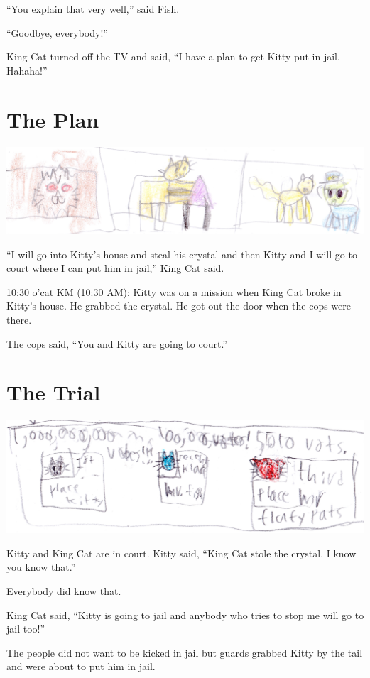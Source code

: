 \documentclass[12pt,oneside]{krantz}
\begin{document}
``You explain that very well,'' said Fish.

``Goodbye, everybody!''

King Cat turned off the TV and said, ``I have a plan to get Kitty put in
jail. Hahaha!''

\hypertarget{the-plan}{%
\chapter{The Plan}\label{the-plan}}

\includegraphics{img/cattriangle.jpg}

``I will go into Kitty's house and steal his crystal and then Kitty and
I will go to court where I can put him in jail,'' King Cat said.

10:30 o'cat KM (10:30 AM): Kitty was on a mission when King Cat broke in
Kitty's house. He grabbed the crystal. He got out the door when the cops
were there.

The cops said, ``You and Kitty are going to court.''

\hypertarget{the-trial}{%
\chapter{The Trial}\label{the-trial}}

\includegraphics{img/thirdplace.jpg}

Kitty and King Cat are in court. Kitty said, ``King Cat stole the
crystal. I know you know that.''

Everybody did know that.

King Cat said, ``Kitty is going to jail and anybody who tries to stop me
will go to jail too!''

The people did not want to be kicked in jail but guards grabbed Kitty by
the tail and were about to put him in jail.
\end{document}
